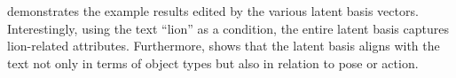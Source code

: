  demonstrates the example results edited by the various latent basis vectors.
Interestingly, using the text ``lion'' as a condition, 
the entire latent basis {captures lion-related attributes.} %
Furthermore,  shows that the latent basis aligns with the text not only in terms of object types but also in relation to pose or action.


